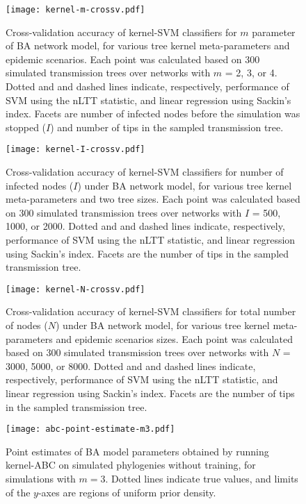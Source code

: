 \documentclass[12pt]{article}\usepackage[]{graphicx}\usepackage[]{color}
\begin{document}
\begin{figure}[ht]
  \centering
  \texttt{[image: kernel-m-crossv.pdf]}
  \caption{Cross-validation accuracy of kernel-SVM classifiers for $m$
      parameter of \gls{BA} network model, for various tree kernel
      meta-parameters and epidemic scenarios. Each point was calculated based
      on 300 simulated transmission trees over networks with $m$ = 2, 3, or 4.
      Dotted and and dashed lines indicate, respectively, performance of SVM
      using the \gls{nLTT} statistic, and linear regression using Sackin's
      index. Facets are number of infected nodes before the simulation was
      stopped ($I$) and number of tips in the sampled transmission tree.
  }
  \label{fig:mcrossv}
\end{figure}

\begin{figure}[ht]
  \centering
  \texttt{[image: kernel-I-crossv.pdf]}
  \caption{Cross-validation accuracy of kernel-SVM classifiers for number of
      infected nodes ($I$) under \gls{BA} network model, for various tree
      kernel meta-parameters and two tree sizes. Each point was calculated
      based on 300 simulated transmission trees over networks with $I$ = 500,
      1000, or 2000. Dotted and and dashed lines indicate, respectively,
      performance of SVM using the \gls{nLTT} statistic, and linear regression
      using Sackin's index. Facets are the number of tips in the sampled
      transmission tree.
  }
  \label{fig:Icrossv}
\end{figure}

\begin{figure}[ht]
  \centering
  \texttt{[image: kernel-N-crossv.pdf]}
  \caption{Cross-validation accuracy of kernel-SVM classifiers for total number
      of nodes ($N$) under \gls{BA} network model, for various tree kernel
      meta-parameters and epidemic scenarios sizes. Each point was calculated
      based on 300 simulated transmission trees over networks with $N$ = 3000,
      5000, or 8000. Dotted and and dashed lines indicate, respectively,
      performance of SVM using the \gls{nLTT} statistic, and linear regression
      using Sackin's index. Facets are the number of tips in the sampled
      transmission tree.
  }
  \label{fig:Ncrossv}
\end{figure}

\begin{figure}[ht]
  \centering
  \texttt{[image: abc-point-estimate-m3.pdf]}
  \caption{
    Point estimates of \gls{BA} model parameters obtained by running kernel-ABC
    on simulated phylogenies without training, for simulations with $m = 3$.
    Dotted lines indicate true values, and limits of the $y$-axes are regions
    of uniform prior density.
  }
  \label{fig:abcptm3}
\end{figure}
\end{document}
